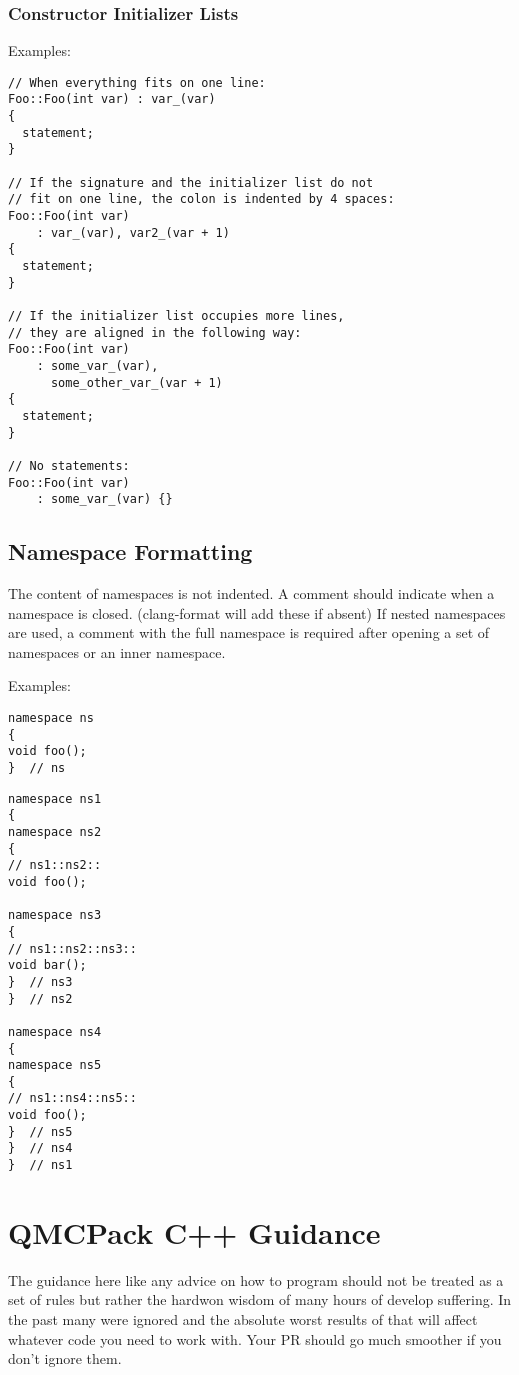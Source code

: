 \subsubsection{Constructor Initializer Lists}

Examples:
\begin{lstlisting}
// When everything fits on one line:
Foo::Foo(int var) : var_(var) 
{
  statement;
}

// If the signature and the initializer list do not
// fit on one line, the colon is indented by 4 spaces:
Foo::Foo(int var)
    : var_(var), var2_(var + 1)
{
  statement;
}

// If the initializer list occupies more lines,
// they are aligned in the following way:
Foo::Foo(int var)
    : some_var_(var),
      some_other_var_(var + 1) 
{
  statement;
}

// No statements:
Foo::Foo(int var)
    : some_var_(var) {}
\end{lstlisting}

\subsection{Namespace Formatting}
The content of namespaces is not indented.
A comment should indicate when a namespace is closed. (clang-format will add these if absent)
If nested namespaces are used, a comment with the full namespace is required after opening a set of namespaces or an inner namespace.

Examples:
\begin{lstlisting}
namespace ns
{
void foo();
}  // ns
\end{lstlisting}

\begin{lstlisting}
namespace ns1
{
namespace ns2
{
// ns1::ns2::
void foo();

namespace ns3
{
// ns1::ns2::ns3::
void bar();
}  // ns3
}  // ns2

namespace ns4
{
namespace ns5
{
// ns1::ns4::ns5::
void foo();
}  // ns5
}  // ns4
}  // ns1
\end{lstlisting}


\section{QMCPack C++ Guidance}
The guidance here like any advice on how to program should not be treated as a set of rules but rather the hardwon wisdom of many hours of develop suffering. In the past many were ignored and the absolute worst results of that will affect whatever code you need to work with. Your PR should go much smoother if you don't ignore them.

